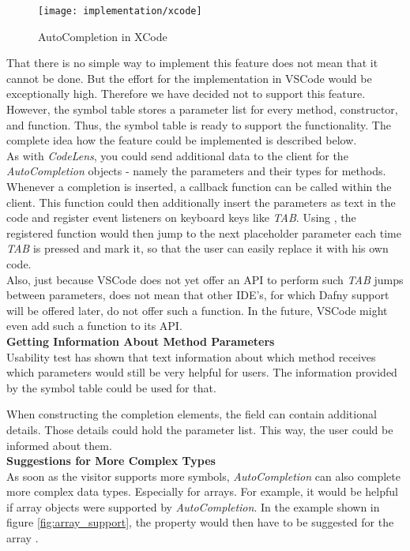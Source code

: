 \begin{figure}[H]
    \centering
    \texttt{[image: implementation/xcode]}
    \caption{AutoCompletion in XCode}
    \label{fig:xcode_completion}
\end{figure}

That there is no simple way to implement this feature does not mean that it cannot be done.
But the effort for the implementation in VSCode would be exceptionally high.
Therefore we have decided not to support this feature.
However, the symbol table stores a parameter list for every method, constructor, and function.
Thus, the symbol table is ready to support the functionality.
The complete idea how the feature could be implemented is described below. \\

As with \textit{CodeLens}, you could send additional data to the client
for the \textit{AutoCompletion} objects - namely the parameters and their types for methods.
Whenever a completion is inserted, a callback function can be called within the client.
This function could then additionally insert the parameters as text in the code and register
event listeners on keyboard keys like \textit{TAB}.
Using , the registered function would then jump to the next placeholder parameter
each time \textit{TAB} is pressed and mark it, so that the user can easily replace it with his own code. \\

Also, just because VSCode does not yet offer an API to perform such \textit{TAB} jumps between parameters,
does not mean that other IDE's, for which Dafny support will be offered later,
do not offer such a function.
In the future, VSCode might even add such a function to its API. \\

\textbf{Getting Information About Method Parameters} \\
Usability test has shown that text information about which method
receives which parameters would still be very helpful for users.
The information provided by the symbol table could be used for that.

When constructing the completion elements,
the field  can contain additional details.
Those details could hold the parameter list.
This way, the user could be informed about them.\\

\textbf{Suggestions for More Complex Types} \\
As soon as the visitor supports more symbols, \textit{AutoCompletion} can also complete more complex data types.
Especially for arrays.
For example, it would be helpful if array objects were supported by \textit{AutoCompletion}.
In the example shown in figure \ref{fig:array_support},
the property  would then have to be suggested for the array .

